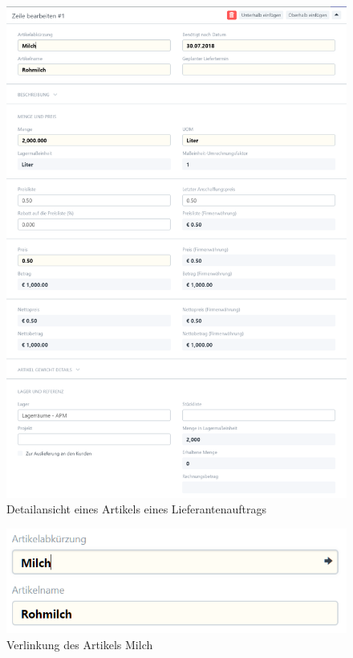\begin{figure}[H]
  \centering
  \includegraphics[width=\textwidth]{Bilder/Lieferantenauftrag_Produktdetail.PNG}
  \caption{Detailansicht eines Artikels eines Lieferantenauftrags}
  \label{fig:auftrDetail}
\end{figure}
\begin{figure}[H]
  \centering
  \includegraphics[width=\textwidth]{Bilder/Milch_Link.PNG}
  \caption{Verlinkung des Artikels Milch}
  \label{fig:verlArtikel}
\end{figure}
